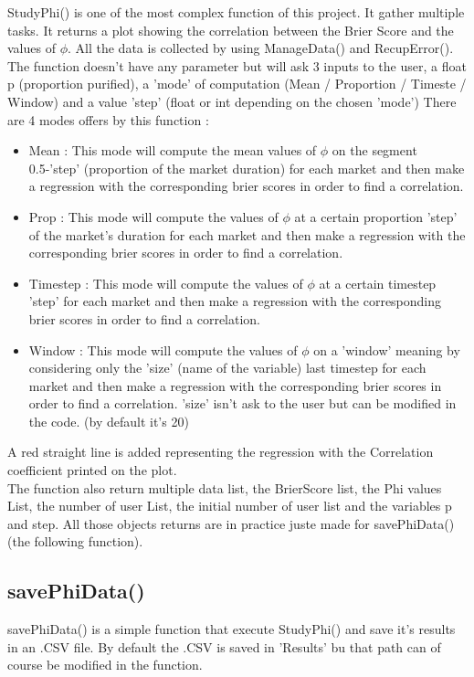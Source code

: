 \documentclass{report}
\begin{document}
StudyPhi() is one of the most complex function of this project. It gather multiple tasks. It returns a plot showing the correlation between the Brier Score and the values of $\phi $. All the data is collected by using ManageData() and RecupError(). The function doesn't have any parameter but will ask 3 inputs to the user, a float p (proportion purified), a 'mode' of computation (Mean / Proportion / Timeste / Window) and a value 'step' (float or int depending on the chosen 'mode') There are 4 modes offers by this function :
\begin{itemize}
\item Mean : This mode will compute the mean values of $\phi $ on the segment 0.5-'step' (proportion of the market duration) for each market and then make a regression with the corresponding brier scores in order to find a correlation.
\item Prop : This mode will compute the values of $\phi $ at a certain proportion 'step' of the market's duration for each market and then make a regression with the corresponding brier scores in order to find a correlation.
\item Timestep : This mode will compute the values of $\phi $ at a certain timestep 'step' for each market and then make a regression with the corresponding brier scores in order to find a correlation.
\item Window : This mode will compute the values of $\phi $ on a 'window' meaning by considering only the 'size' (name of the variable) last timestep for each market and then make a regression with the corresponding brier scores in order to find a correlation. 'size' isn't ask to the user but can be modified in the code. (by default it's 20)
\end{itemize}

A red straight line is added representing the regression with the Correlation coefficient printed on the plot.\\
The function also return multiple data list, the BrierScore list, the Phi values List, the number of user List, the initial number of user list and the variables p and step. All those objects returns are in practice juste made for savePhiData() (the following function).



\subsection{savePhiData()}

savePhiData() is a simple function that execute StudyPhi() and save it's results in an .CSV file. By default the .CSV is saved in 'Results' bu that path can of course be modified in the function.
\end{document}
